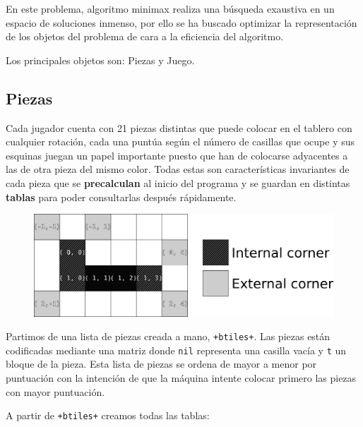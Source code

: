 En este problema, algoritmo minimax realiza una búsqueda exaustiva en un espacio
de soluciones inmenso, por ello se ha buscado optimizar la representación de los
objetos del problema de cara a la eficiencia del algoritmo.

Los principales objetos son: Piezas y Juego.

\subsection{Piezas}
\label{subsec:piezas}
Cada jugador cuenta con 21 piezas distintas que puede colocar en el tablero con
cualquier rotación, cada una puntúa según el número de casillas que ocupe y sus
esquinas juegan un papel importante puesto que han de colocarse adyacentes a las
de otra pieza del mismo color. Todas estas son características invariantes de
cada pieza que se \textbf{precalculan} al inicio del programa y se guardan en
distintas \textbf{tablas} para poder consultarlas después rápidamente.

\begin{figure}[ht]
	\centering
	\includegraphics[width=\textwidth, height=0.3\textheight, keepaspectratio]{img/corners}
\end{figure}

Partimos de una lista de piezas creada a mano, \texttt{+btiles+}. Las
piezas están codificadas mediante una matriz donde \texttt{nil} representa una
casilla vacía y \texttt{t} un bloque de la pieza. Esta lista de piezas se ordena
de mayor a menor por puntuación con la intención de que la máquina intente
colocar primero las piezas con mayor puntuación.

A partir de \texttt{+btiles+} creamos todas las tablas:


